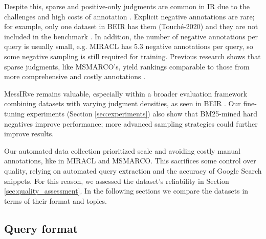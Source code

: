 \documentclass[11pt]{article}
\begin{document}
Despite this, sparse and positive-only judgments are common in IR due to the challenges and high costs of annotation \citep{lin2022pretrained}. 
Explicit negative annotations are rare; for example, only one dataset in BEIR has them (Touché-2020) and they are not included in the benchmark \citep{thakur2021beir}. In addition, the number of negative annotations per query is usually small, e.g. MIRACL has 5.3 negative annotations per query, so some negative sampling is still required for training.
Previous research shows that sparse judgments, like MSMARCO's, yield rankings comparable to those from more comprehensive and costly annotations \citep{zhang2021mr}.

MessIRve remains valuable, especially within a broader evaluation framework combining datasets with varying judgment densities, as seen in BEIR \citep{thakur2021beir}. Our fine-tuning experiments (Section \ref{sec:experiments}) also show that BM25-mined hard negatives improve performance; more advanced sampling strategies could further improve results.

Our automated data collection prioritized scale and avoiding costly manual annotations, like in MIRACL and MSMARCO. This sacrifices some control over quality, relying on automated query extraction and the accuracy of Google Search snippets. For this reason, we assessed the dataset's reliability in Section \ref{sec:quality_assessment}. 
In the following sections we compare the datasets in terms of their format and topics.



\subsection{Query format} \label{sec:queries_format}
\end{document}
